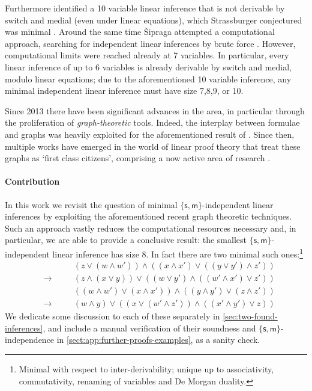 \documentclass[a4paper, UKenglish, cleveref]{lipics-v2021}
\newcommand{\m}{\ensuremath{\mathsf{m}}}
\newcommand{\s}{\ensuremath{\mathsf{s}}}
\begin{document}
Furthermore \cite{Das13:lin-inf-rew} identified a 10 variable linear inference that is not derivable by switch and medial (even under linear equations), which Strassburger conjectured was minimal \cite{Str12:private-conjecture}.
Around the same time \v{S}ipraga attempted a computational approach, searching for independent linear inferences by brute force \cite{Sip12:aut-search-lin-inf}.
However, computational limits were reached already at 7 variables.
In particular, every linear inference of up to 6 variables is already derivable by switch and medial, modulo linear equations; due to the aforementioned 10 variable inference, any minimal independent linear inference must have size 7,8,9, or 10.


Since 2013 there have been significant advances in the area, in particular through the proliferation of \emph{graph-theoretic} tools.
Indeed, the interplay between formulae and graphs was heavily exploited for the aforementioned result of \cite{DasStr15:no-comp-lin-sys,DasStr16:no-compl-lin-sys}.
Since then, multiple works have emerged in the world of linear proof theory that treat these graphs as `first class citizens', comprising a now active area of research \cite{NguSei18:coh-int-graphs,AccHorStr20:mll-graphs-short,AccHorStr20:mll-graphs-full,CalDasWar20:bgl}.


\paragraph*{Contribution}
In this work we revisit the question of minimal $\{\s,\m\}$-independent linear inferences by exploiting the aforementioned recent graph theoretic techniques.
Such an approach vastly reduces the computational resources necessary and, in particular, we are able to provide a conclusive result:
the smallest $\{\s,\m \}$-independent linear inference has size 8. In fact there are two minimal such ones:\footnote{Minimal with respect to inter-derivability; unique up to associativity, commutativity, renaming of variables and De Morgan duality.}
\begin{equation}
  \label{eq:php32-derived-inf}
  \begin{alignedat}{2}
    & &&(z \lor (w \land w')) \land ((x \land x' ) \lor ((y \lor y') \land z'))\\
    & \to &\quad&(z \land (x \lor y)) \lor ((w \lor y') \land ((w' \land x')  \lor z') )
  \end{alignedat}
\end{equation}
\vspace{-5pt}%
\begin{equation}
  \label{eq:counterexample-inference}
  \begin{alignedat}{2}
    & &&((w \land w') \lor (x \land x')) \land ((y \land y') \lor (z \land z'))\\
    & \to&\quad& (w \land y) \lor ((x \lor (w'\land z')) \land ((x'\land y') \lor z) )
  \end{alignedat}
\end{equation}
We dedicate some discussion to each of these separately in \cref{sec:two-found-inferences}, and include a manual verification of their soundness and $\{\s,\m \}$-independence in \cref{sect:app:further-proofs-examples}, as a sanity check.
\end{document}

